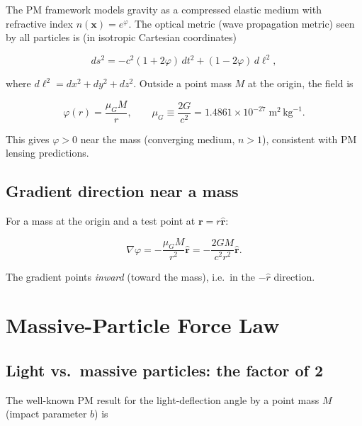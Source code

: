 \documentclass[11pt,a4paper]{article}
\newcommand{\muG}{\mu_G}
\begin{document}
The PM framework models gravity as a compressed elastic medium with
refractive index $n(\mathbf{x}) = e^{\varphi}$.  The optical metric
(wave propagation metric) seen by all particles is (in isotropic
Cartesian coordinates)

\begin{equation}
  ds^2 = -c^2(1 + 2\varphi)\,dt^2 + (1 - 2\varphi)\,d\ell^2,
  \label{eq:metric}
\end{equation}

where $d\ell^2 = dx^2 + dy^2 + dz^2$.  Outside a point mass $M$ at the
origin, the field is

\begin{equation}
  \varphi(r) = \frac{\muG M}{r}, \qquad \muG \equiv \frac{2G}{c^2}
             = 1.4861 \times 10^{-27}\;\text{m}^2\,\text{kg}^{-1}.
  \label{eq:phi_exterior}
\end{equation}

This gives $\varphi > 0$ near the mass (converging medium, $n > 1$), consistent
with PM lensing predictions.

\subsection{Gradient direction near a mass}

For a mass at the origin and a test point at $\mathbf{r} = r\hat{\mathbf{r}}$:

\begin{equation}
  \nabla\varphi = -\frac{\muG M}{r^2}\hat{\mathbf{r}}
               = -\frac{2GM}{c^2 r^2}\hat{\mathbf{r}}.
  \label{eq:grad_phi}
\end{equation}

The gradient points \emph{inward} (toward the mass), i.e.\ in the $-\hat{r}$
direction.

\section{Massive-Particle Force Law}

\subsection{Light vs.\ massive particles: the factor of 2}

The well-known PM result for the light-deflection angle by a point mass $M$
(impact parameter $b$) is
\end{document}
